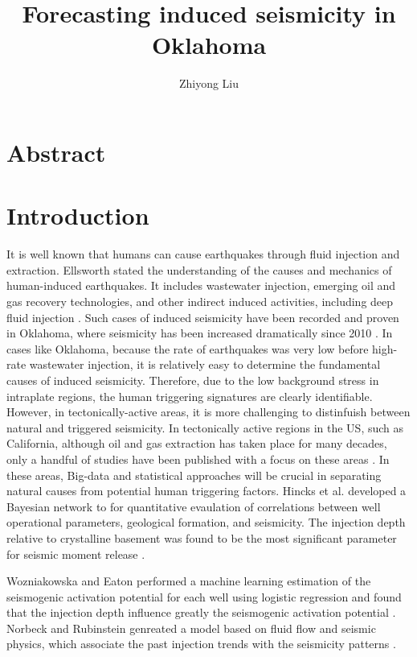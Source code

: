 \documentclass[project-plan]{report-template}
\title{Forecasting induced seismicity in Oklahoma}
\author{Zhiyong Liu}
\begin{document}
\maketitlepage  %
\githubrepo  %

\section*{Abstract}
\blindtext  %
\newpage

\section{Introduction}
It is well known that humans can cause earthquakes through fluid injection and extraction. Ellsworth stated the understanding of the causes and mechanics of human-induced earthquakes. It includes wastewater injection, emerging oil and gas recovery technologies, and other indirect induced activities,
including deep fluid injection \citep{ellsworth2013injection}.
Such cases of induced seismicity have been recorded and proven in Oklahoma, where seismicity has been increased dramatically since 2010 \citep{ellsworth2013injection}.
In cases like Oklahoma, because the rate of earthquakes was very low before high-rate wastewater injection, it is relatively easy to determine the fundamental causes of induced seismicity.
Therefore, due to the low background stress in intraplate regions, the human triggering signatures are clearly identifiable.
However, in tectonically-active areas, it is more challenging to distinfuish between natural and triggered seismicity.
In tectonically active regions in the US, such as California, although oil and gas extraction has taken place for many decades, only a handful of studies have been published with a focus on these areas \citep{Hough2017WasTM}. 
In these areas, Big-data and statistical approaches will be crucial in separating natural causes from potential human triggering factors.
Hincks et al. developed a Bayesian network to for quantitative evaulation of correlations between well operational parameters, geological formation, and seismicity.
The injection depth relative to crystalline basement was found to be the most significant parameter for seismic moment release \citep{hincks2018oklahoma}.


Wozniakowska and Eaton performed a machine learning estimation of the seismogenic activation potential for each well using logistic regression and found that the injection depth influence greatly the seismogenic activation potential \citep{wozniakowska2020machine}.
Norbeck and Rubinstein genreated a model based on fluid flow and seismic physics, which associate the past injection trends with the seismicity patterns \citep{norbeck2018hydromechanical}.
\end{document}
